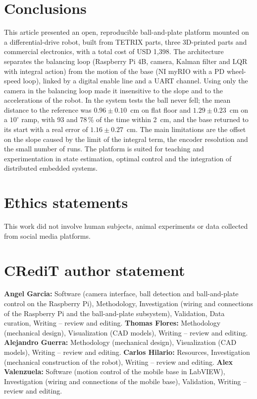 \documentclass[11pt,letterpaper]{article}
\begin{document}
\section{Conclusions}
This article presented an open, reproducible ball-and-plate platform
mounted on a differential-drive robot, built from TETRIX parts, three
3D-printed parts and commercial electronics, with a total cost of
USD 1,398. The architecture separates the balancing loop (Raspberry
Pi 4B, camera, Kalman filter and LQR with integral action) from the
motion of the base (NI myRIO with a PD wheel-speed loop), linked by a
digital enable line and a UART channel. Using only the camera in the
balancing loop made it insensitive to the slope and to the
accelerations of the robot. In the system tests the ball never fell;
the mean distance to the reference was $0.96\pm0.10$~cm on flat floor
and $1.29\pm0.23$~cm on a $10^\circ$ ramp, with 93 and 78\,\% of the
time within 2~cm, and the base returned to its start with a real error
of $1.16\pm0.27$~cm. The main limitations are the offset on the slope
caused by the limit of the integral term, the encoder resolution and
the small number of runs. The platform is suited for teaching and
experimentation in state estimation, optimal control and the
integration of distributed embedded systems.

\section*{Ethics statements}
This work did not involve human subjects, animal experiments or data
collected from social media platforms.

\section*{CRediT author statement}
\textbf{Angel Garcia:} Software (camera interface, ball detection and
ball-and-plate control on the Raspberry Pi), Methodology, Investigation
(wiring and connections of the Raspberry Pi and the ball-and-plate
subsystem), Validation, Data curation, Writing -- review and editing.
\textbf{Thomas Flores:} Methodology (mechanical design), Visualization
(CAD models), Writing -- review and editing.
\textbf{Alejandro Guerra:} Methodology (mechanical design),
Visualization (CAD models), Writing -- review and editing.
\textbf{Carlos Hilario:} Resources, Investigation (mechanical
construction of the robot), Writing -- review and editing.
\textbf{Alex Valenzuela:} Software (motion control of the mobile base in
LabVIEW), Investigation (wiring and connections of the mobile base),
Validation, Writing -- review and editing.
\end{document}
